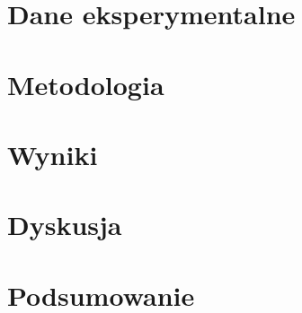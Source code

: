 \documentclass{pracalicmgr}
\begin{document}
    \chapter{Dane eksperymentalne}    
    \chapter{Metodologia}
    \chapter{Wyniki}
    \chapter{Dyskusja}
    \chapter{Podsumowanie}
    
    \printbibliography
    
\end{document}
